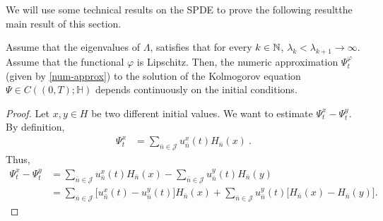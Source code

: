 \documentclass[review,onefignum,onetabnum]{siamart190516}
\begin{document}
%
        We will use some technical results on the SPDE to prove
        the following result\textemdash the main result of this section.
%
        \begin{theorem}
            \label{thm:ic_continuity}
            Assume that the eigenvalues of $\Lambda$, satisfies that for every 
            $k\in{\mathbb N}$,
            $\lambda_k<\lambda_{k+1}\rightarrow \infty $. Assume that
            the functional $ \varphi$ is Lipschitz.
            Then, the numeric approximation $\Psi_t^\varphi$ (given by 
            \eqref{num-approx})
            to the solution of the Kolmogorov equation
            ${\Psi\in C((0,T); \mathbb{H})}$ depends continuously on the initial
            conditions.
        \end{theorem}
        \begin{proof}
        Let $x,y\in H$ be two different initial values. We want to estimate
        $\Psi_t^x-\Psi_t^y$. By definition,
        \begin{align}
            \Psi_t^x
                &= \sum_{\bar n\in \mathcal{J}}
                    u_{\bar n} ^ x(t) H_{\bar n}(x) \ .
        \end{align}
        Thus,
        \begin{equation}
            \label{s3.4}
            \begin{aligned}
                \Psi_t^x-\Psi_t^y
                &=
                    \sum_{\bar n\in \mathcal{J}}
                        u_{\bar n}^x(t)H_{\bar n}(x)
                    -
                    \sum_{\bar n\in \mathcal{J}}
                        u_{\bar n}^y(t)H_{\bar n}(y)
               \\
                &=
                    \sum_{\bar n\in \mathcal{J}}
                        \Big[ u_{\bar n}^x(t )- u_{\bar n}^y(t)
                        \Big]H_{\bar n}(x)
                    +
                    \sum_{\bar n\in \mathcal{J}}
                        u_{\bar n}^y(t)
                        \Big[
                            H_{\bar n}(x) - H_{\bar n}(y)
                        \Big].
            \end{aligned}
        \end{equation}
        

\end{proof}
\end{document}
